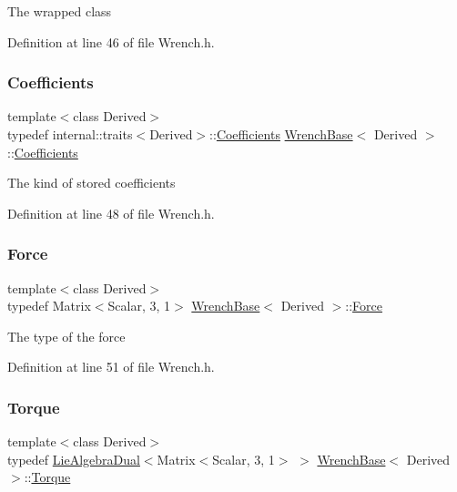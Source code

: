 The wrapped class 

Definition at line 46 of file Wrench.\+h.

\hypertarget{class_wrench_base_a1041b592a70fd6bb5b19afbb418dfa69}{}\label{class_wrench_base_a1041b592a70fd6bb5b19afbb418dfa69} 
\subsubsection{\texorpdfstring{Coefficients}{Coefficients}}
{\footnotesize\ttfamily template$<$class Derived$>$ \\
typedef internal\+::traits$<$Derived$>$\+::\hyperlink{class_wrench_base_a1041b592a70fd6bb5b19afbb418dfa69}{Coefficients} \hyperlink{class_wrench_base}{Wrench\+Base}$<$ Derived $>$\+::\hyperlink{class_wrench_base_a1041b592a70fd6bb5b19afbb418dfa69}{Coefficients}}

The kind of stored coefficients 

Definition at line 48 of file Wrench.\+h.

\hypertarget{class_wrench_base_aa589699bbf0d18c023a0a2fe6482b4a7}{}\label{class_wrench_base_aa589699bbf0d18c023a0a2fe6482b4a7} 
\subsubsection{\texorpdfstring{Force}{Force}}
{\footnotesize\ttfamily template$<$class Derived$>$ \\
typedef Matrix$<$Scalar, 3, 1$>$ \hyperlink{class_wrench_base}{Wrench\+Base}$<$ Derived $>$\+::\hyperlink{class_wrench_base_aa589699bbf0d18c023a0a2fe6482b4a7}{Force}}

The type of the force 

Definition at line 51 of file Wrench.\+h.

\hypertarget{class_wrench_base_a8fa1b5e32e8418247118cc24be70d68d}{}\label{class_wrench_base_a8fa1b5e32e8418247118cc24be70d68d} 
\subsubsection{\texorpdfstring{Torque}{Torque}}
{\footnotesize\ttfamily template$<$class Derived$>$ \\
typedef \hyperlink{class_lie_algebra_dual}{Lie\+Algebra\+Dual}$<$Matrix$<$Scalar, 3, 1$>$ $>$ \hyperlink{class_wrench_base}{Wrench\+Base}$<$ Derived $>$\+::\hyperlink{class_wrench_base_a8fa1b5e32e8418247118cc24be70d68d}{Torque}}

